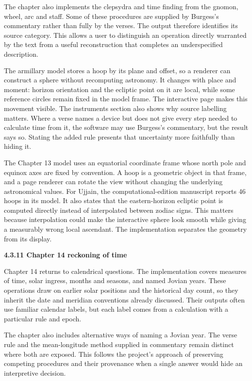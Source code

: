 \documentclass[
]{article}
\begin{document}
The chapter also implements the clepsydra and time finding from the
gnomon, wheel, arc and staff. Some of these procedures are supplied by
Burgess's commentary rather than fully by the verses. The output
therefore identifies its source category. This allows a user to
distinguish an operation directly warranted by the text from a useful
reconstruction that completes an underspecified description.

The armillary model stores a hoop by its plane and offset, so a renderer
can construct a sphere without recomputing astronomy. It changes with
place and moment: horizon orientation and the ecliptic point on it are
local, while some reference circles remain fixed in the model frame. The
interactive page makes this movement visible. The instruments section
also shows why source labelling matters. Where a verse names a device
but does not give every step needed to calculate time from it, the
software may use Burgess's commentary, but the result says so. Stating
the added rule presents that uncertainty more faithfully than hiding it.

The Chapter 13 model uses an equatorial coordinate frame whose north
pole and equinox axes are fixed by convention. A hoop is a geometric
object in that frame, and a page renderer can rotate the view without
changing the underlying astronomical values. For Ujjain, the
computational-edition manuscript reports 46 hoops in its model. It also
states that the eastern-horizon ecliptic point is computed directly
instead of interpolated between zodiac signs. This matters because
interpolation could make the interactive sphere look smooth while giving
a measurably wrong local ascendant. The implementation separates the
geometry from its display.

\textbf{4.3.11 Chapter 14 reckoning of time}

Chapter 14 returns to calendrical questions. The implementation covers
measures of time, solar ingress, months and seasons, and named Jovian
years. These operations draw on earlier solar positions and the
historical day count, so they inherit the date and meridian conventions
already discussed. Their outputs often use familiar calendar labels, but
each label comes from a calculation with a particular rule and epoch.

The chapter also includes alternative ways of naming a Jovian year. The
verse rule and the mean-longitude method supplied in commentary remain
distinct where both are exposed. This follows the project's approach of
preserving competing procedures and their provenance when a single
answer would hide an interpretive decision.
\end{document}

